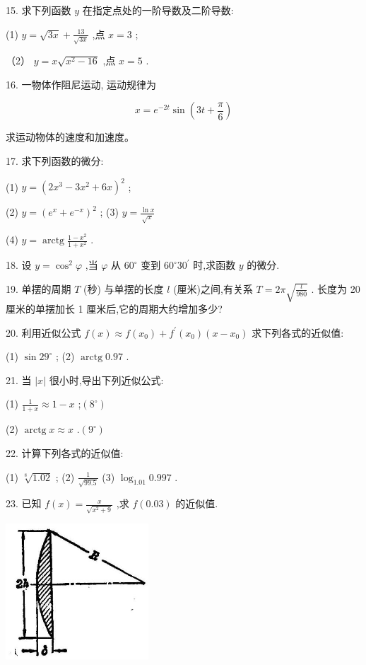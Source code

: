 \documentclass[10pt]{article}
\begin{document}
15. 求下列函数 \(y\) 在指定点处的一阶导数及二阶导数:

(1) \(y = \sqrt{3x} + \frac{13}{\sqrt{3x}}\) ,点 \(x = 3\) ;

（2） \(y = x\sqrt{{x}^{2} - {16}}\) ,点 \(x = 5\) .

16. 一物体作阻尼运动, 运动规律为

\[
x = {e}^{-{2t}}\sin \left( {{3t} + \frac{\pi }{6}}\right)
\]

求运动物体的速度和加速度。

17. 求下列函数的微分:

(1) \(y = {\left( 2{x}^{3} - 3{x}^{2} + 6x\right) }^{2}\) ;

(2) \(y = {\left( {e}^{x} + {e}^{-x}\right) }^{2}\) ; (3) \(y = \frac{\ln x}{\sqrt{x}}\)

(4) \(y = \operatorname{arctg}\frac{1 - {x}^{2}}{1 + {x}^{2}}\) .

18. 设 \(y = {\cos }^{2}\varphi\) ,当 \(\varphi\) 从 \({60}^{ \circ }\) 变到 \({60}^{ \circ }{30}^{\prime }\) 时,求函数 \(y\) 的微分.

19. 单摆的周期 \(T\) (秒) 与单摆的长度 \(l\) (厘米)之间,有关系 \(T = {2\pi }\sqrt{\frac{l}{980}}\) . 长度为 20 厘米的单摆加长 1 厘米后,它的周期大约增加多少?

20. 利用近似公式 \(f\left( x\right) \approx f\left( {x}_{0}\right) + {f}^{\prime }\left( {x}_{0}\right) \left( {x - {x}_{0}}\right)\) 求下列各式的近似值:

(1) \(\sin {29}^{ \circ }\) ; (2) \(\operatorname{arctg}{0.97}\) .

21. 当 \(\left| x\right|\) 很小时,导出下列近似公式:

(1) \(\frac{1}{1 + x} \approx 1 - x\) ;\(\left( {8}^{ \circ }\right)\)

(2) \(\operatorname{arctg}x \approx x\) .\(\left( {9}^{ \circ }\right)\)

22. 计算下列各式的近似值:

(1) \(\sqrt[8]{1.02}\) ; (2) \(\frac{1}{\sqrt{99.5}}\) (3) \({\log }_{1.01}{0.997}\) .

23. 已知 \(f\left( x\right) = \frac{x}{\sqrt{{x}^{2} + 9}}\) ,求 \(f\left( {0.03}\right)\) 的近似值.

\begin{center}
\includegraphics[max width=0.4\textwidth]{images/01912c18-5c3f-733d-b775-749ba9897a9d_128_440234.jpg}
\end{center}
\end{document}
